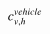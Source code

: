 

    \[\let\par\empty

    
{{{{\miitalic{c}}}\sb{{{\miitalic{v}}{\miitalic{,}}{\miitalic{h}}}}\sp{{\miitalic{vehicle}}}}}


    \]

  